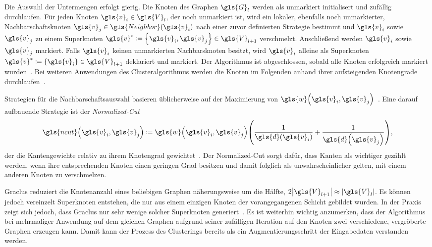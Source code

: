 Die Auswahl der Untermengen erfolgt gierig.
Die Knoten des Graphen $\gls{G}_l$ werden als unmarkiert initialisert und zufällig durchlaufen.
Für jeden Knoten $\gls{v}_i \in \gls{V}_l$, der noch unmarkiert ist, wird ein lokaler, ebenfalls noch unmarkierter, Nachbarschaftsknoten $\gls{v}_j \in \gls{Neighbor}\left(\gls{v}_i\right)$ nach einer zuvor definierten Strategie bestimmt und $\gls{v}_i$ sowie $\gls{v}_j$ zu einem Superknoten $\gls{v}^* \coloneqq \left\{ \gls{v}_i, \gls{v}_j \right\} \in \gls{V}_{l+1}$ verschmelzt.
Anschließend werden $\gls{v}_i$ sowie $\gls{v}_j$ markiert.
Falls $\gls{v}_i$ keinen unmarkierten Nachbarsknoten besitzt, wird $\gls{v}_i$ alleine als Superknoten $\gls{v}^* \coloneqq \left\{ \gls{v}_i \right\} \in \gls{V}_{l+1}$ deklariert und markiert.
Der Algorithmus ist abgeschlossen, sobald alle Knoten erfolgreich markiert wurden~\cite{graclus}.
Bei weiteren Anwendungen des Clusteralgorithmus werden die Knoten im Folgenden anhand ihrer aufsteigenden Knotengrade durchlaufen~\cite{Defferrard}.

Strategien für die Nachbarschaftsauswahl basieren üblicherweise auf der Maximierung von $\gls{w}\left(\gls{v}_i, \gls{v}_j \right)$~\cite{graclus}.
Eine darauf aufbauende Strategie ist der \emph{Normalized-Cut}
\begin{equation*}
  \gls{ncut}\left(\gls{v}_i, \gls{v}_j\right) \coloneqq \gls{w}\left(\gls{v}_i, \gls{v}_j \right) \left(\frac{1}{\gls{d}\left(\gls{v}_i\right)} + \frac{1}{\gls{d}\left(\gls{v}_j\right)}\right),
\end{equation*}
der die Kantengewichte relativ zu ihrem Knotengrad gewichtet~\cite{Defferrard, graclus}.
Der Nor\-ma\-li\-zed-Cut sorgt dafür, dass Kanten als wichtiger gezählt werden, wenn ihre entsprechenden Knoten einen geringen Grad besitzen und damit folglich als unwahrscheinlicher gelten, mit einem anderen Knoten zu verschmelzen.

Graclus reduziert die Knotenanzahl eines beliebigen Graphen näherungsweise um die Hälfte, \dhe{} $2 \left|\gls{V}_{l+1}\right| \approx \left|\gls{V}_l\right|$.
Es können jedoch vereinzelt Superknoten entstehen, die nur aus einem einzigen Knoten der vorangegangenen Schicht gebildet wurden.
In der Praxis zeigt sich jedoch, dass Graclus nur sehr wenige solcher Superknoten generiert~\cite{Defferrard}.
Es ist weiterhin wichtig anzumerken, dass der Algorithmus bei mehrmaliger Anwendung auf dem gleichen Graphen aufgrund seiner zufälligen Iteration auf den Knoten zwei verschiedene, vergröberte Graphen erzeugen kann.
Damit kann der Prozess des Clusterings bereits als ein Augmentierungsschritt der Eingabedaten verstanden werden.

